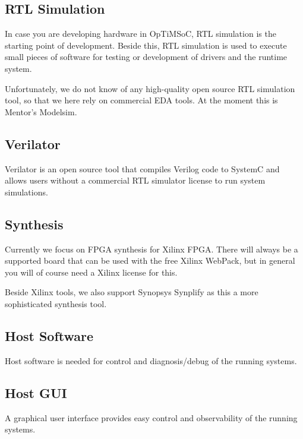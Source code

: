 \subsection*{RTL Simulation}

In case you are developing hardware in OpTiMSoC, RTL simulation is the
starting point of development. Beside this, RTL simulation is used to
execute small pieces of software for testing or development of drivers
and the runtime system.

Unfortunately, we do not know of any high-quality open source RTL
simulation tool, so that we here rely on commercial EDA tools. At the
moment this is Mentor's Modelsim.

\subsection*{Verilator}

Verilator is an open source tool that compiles Verilog code to SystemC
and allows users without a commercial RTL simulator license to run
system simulations.

\subsection*{Synthesis}

Currently we focus on FPGA synthesis for Xilinx FPGA. There will
always be a supported board that can be used with the free Xilinx
WebPack, but in general you will of course need a Xilinx license for
this.

Beside Xilinx tools, we also support Synopsys Synplify as this a more
sophisticated synthesis tool.

\subsection*{Host Software}

Host software is needed for control and diagnosis/debug of the running
systems.

\subsection*{Host GUI}

A graphical user interface provides easy control and observability of
the running systems.
